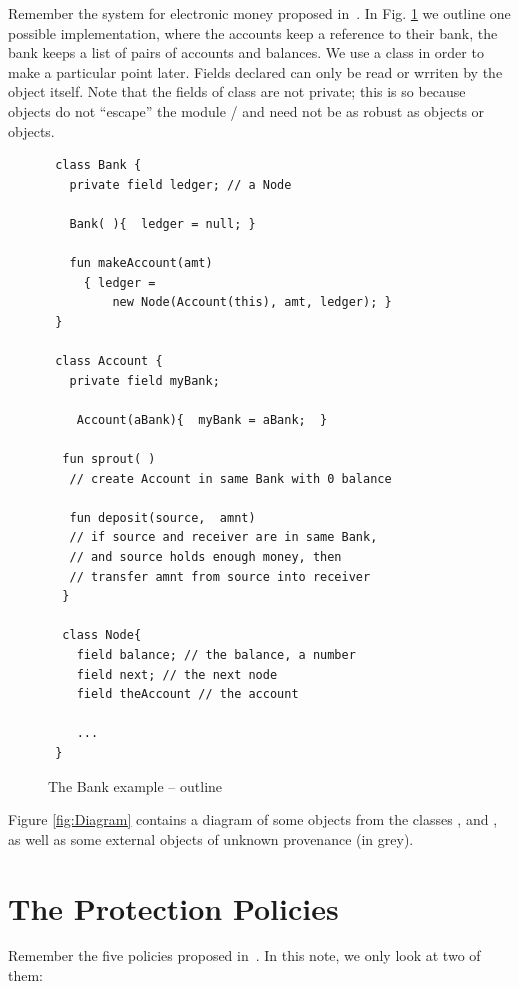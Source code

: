 \documentclass[preprint,10pt]{sigplanconf}
\begin{document}
Remember the system for electronic money
proposed in~\cite{ELang}. In Fig. \ref{fig:Bank} we outline one possible implementation, where 
the accounts keep a reference to their bank, the bank keeps a
list of pairs of accounts and balances. We use a class  in order to make a particular point later.
Fields declared   can only be read or wrriten by the object itself. Note that the fields of class  are
not private; this is so because  objects do not ``escape'' the module / and 
need not be as 
robust as    objects or  objects.
 
\begin{figure}[tbp]
\begin{lstlisting}
 class Bank {  
   private field ledger; // a Node
     
   Bank( ){  ledger = null; }
      
   fun makeAccount(amt) 
     { ledger = 
         new Node(Account(this), amt, ledger); }
 }           

 class Account {
   private field myBank;

    Account(aBank){  myBank = aBank;  }
  
  fun sprout( )
   // create Account in same Bank with 0 balance

   fun deposit(source,  amnt)
   // if source and receiver are in same Bank,
   // and source holds enough money, then
   // transfer amnt from source into receiver
  }
  
  class Node{
    field balance; // the balance, a number
    field next; // the next node
    field theAccount // the account
    
    ...
 }
\end{lstlisting}
\caption{The Bank example -- outline}
\label{fig:Bank}
 \end{figure}

Figure \ref{fig:Diagram} contains a diagram of some objects from the
 classes ,  and , as well as some 
 external objects of unknown provenance (in grey).

\section{The Protection Policies}
Remember the five policies  proposed in~\cite{ELang}. In this note, we only look at two of them:
\end{document}
